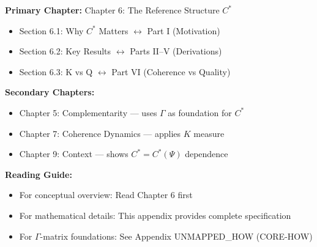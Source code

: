\begin{tcolorbox}[colback=purple!5!white, colframe=purple!75!black,
    title=\textbf{Chapter Linkages}]

\textbf{Primary Chapter:} Chapter 6: The Reference Structure $C^*$
\begin{itemize}[nosep]
    \item Section 6.1: Why $C^*$ Matters $\leftrightarrow$ Part I (Motivation)
    \item Section 6.2: Key Results $\leftrightarrow$ Parts II--V (Derivations)
    \item Section 6.3: K vs Q $\leftrightarrow$ Part VI (Coherence vs Quality)
\end{itemize}

\textbf{Secondary Chapters:}
\begin{itemize}[nosep]
    \item Chapter 5: Complementarity --- uses $\Gamma$ as foundation for $C^*$
    \item Chapter 7: Coherence Dynamics --- applies $K$ measure
    \item Chapter 9: Context --- shows $C^* = C^*(\Psi)$ dependence
\end{itemize}

\textbf{Reading Guide:}
\begin{itemize}[nosep]
    \item For conceptual overview: Read Chapter 6 first
    \item For mathematical details: This appendix provides complete specification
    \item For $\Gamma$-matrix foundations: See Appendix UNMAPPED_HOW (CORE-HOW)
\end{itemize}

\end{tcolorbox}


